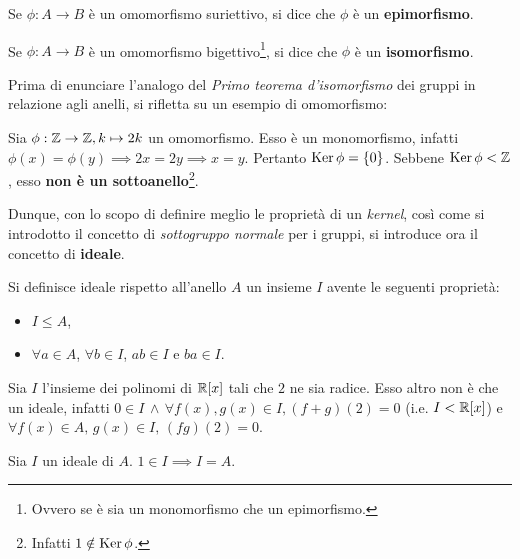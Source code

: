 \begin{definition}
    Se $\phi : A \to B$ è un omomorfismo suriettivo, si dice che
    $\phi$ è un \textbf{epimorfismo}.
\end{definition}

\begin{definition}
    Se $\phi : A \to B$ è un omomorfismo bigettivo\footnote{Ovvero se è sia un monomorfismo che un epimorfismo.}, si dice che
    $\phi$ è un \textbf{isomorfismo}.
\end{definition}

Prima di enunciare l'analogo del \textit{Primo teorema d'isomorfismo} dei gruppi
in relazione agli anelli, si rifletta su un esempio di omomorfismo:

\begin{example}
    Sia $\phi : \mathbb Z \to \mathbb Z, k \mapsto 2k$ un omomorfismo. Esso è un monomorfismo,
    infatti $\phi(x)=\phi(y) \implies 2x=2y \implies x=y$. Pertanto $\operatorname{Ker} \phi = \{0\}$. Sebbene $\operatorname{Ker} \phi < \mathbb Z$, esso \textbf{non è un sottoanello}\footnote{Infatti $1 \notin \operatorname{Ker} \phi$.}.
\end{example}

Dunque, con lo scopo di definire meglio le proprietà di un \textit{kernel},
così come si introdotto il concetto di \textit{sottogruppo normale} per i gruppi, si introduce ora il concetto di \textbf{ideale}.

\begin{definition}
    Si definisce ideale rispetto all'anello $A$ un insieme $I$ avente le seguenti proprietà:

    \begin{itemize}
        \item $I \leq A$,
        \item $\forall a \in A$, $\forall b \in I$, $ab \in I$ e $ba \in I$.
    \end{itemize}
\end{definition}

\begin{example}
    \label{exmpl:polinomi}
    Sia $I$ l'insieme dei polinomi di $\mathbb R[x]$ tali che $2$ ne sia radice. Esso
    altro non è che un ideale, infatti $0 \in I \,\land\, \forall f(x), g(x) \in I, (f+g)(2)=0$ (i.e. $I<\mathbb R[x]$) e $\forall f(x) \in A, \, g(x) \in I, \, (fg)(2) = 0$.
\end{example}

\begin{proposition}
    Sia $I$ un ideale di $A$. $1 \in I \implies I = A$.
\end{proposition}

